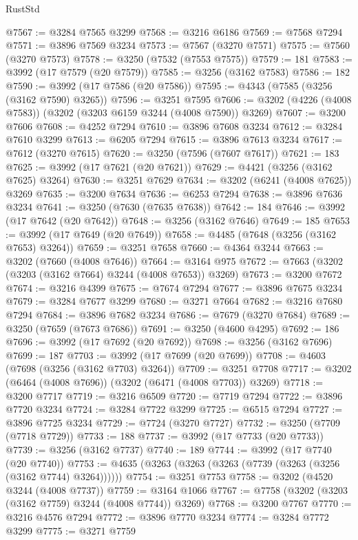 \begin{lexlean}{RustStd}
\begin{coremodule}
@7567 := @3284 @7565 @3299
@7568 := @3216 @6186
@7569 := @7568 @7294
@7571 := @3896 @7569 @3234
@7573 := @7567 (@3270 @7571)
@7575 := @7560 (@3270 @7573)
@7578 := @3250 (@7532 (@7553 @7575))
@7579 := 181
@7583 := @3992 (@17 @7579 (@20 @7579))
@7585 := @3256 (@3162 @7583)
@7586 := 182
@7590 := @3992 (@17 @7586 (@20 @7586))
@7595 := @4343 (@7585 (@3256 (@3162 @7590) @3265))
@7596 := @3251 @7595
@7606 := @3202 (@4226 (@4008 @7583)) (@3202 (@3203 @6159 @3244 (@4008 @7590)) @3269)
@7607 := @3200 @7606
@7608 := @4252 @7294
@7610 := @3896 @7608 @3234
@7612 := @3284 @7610 @3299
@7613 := @6205 @7294
@7615 := @3896 @7613 @3234
@7617 := @7612 (@3270 @7615)
@7620 := @3250 (@7596 (@7607 @7617))
@7621 := 183
@7625 := @3992 (@17 @7621 (@20 @7621))
@7629 := @4421 (@3256 (@3162 @7625) @3264)
@7630 := @3251 @7629
@7634 := @3202 (@6241 (@4008 @7625)) @3269
@7635 := @3200 @7634
@7636 := @6253 @7294
@7638 := @3896 @7636 @3234
@7641 := @3250 (@7630 (@7635 @7638))
@7642 := 184
@7646 := @3992 (@17 @7642 (@20 @7642))
@7648 := @3256 (@3162 @7646)
@7649 := 185
@7653 := @3992 (@17 @7649 (@20 @7649))
@7658 := @4485 (@7648 (@3256 (@3162 @7653) @3264))
@7659 := @3251 @7658
@7660 := @4364 @3244
@7663 := @3202 (@7660 (@4008 @7646))
@7664 := @3164 @975
@7672 := @7663 (@3202 (@3203 (@3162 @7664) @3244 (@4008 @7653)) @3269)
@7673 := @3200 @7672
@7674 := @3216 @4399
@7675 := @7674 @7294
@7677 := @3896 @7675 @3234
@7679 := @3284 @7677 @3299
@7680 := @3271 @7664
@7682 := @3216 @7680 @7294
@7684 := @3896 @7682 @3234
@7686 := @7679 (@3270 @7684)
@7689 := @3250 (@7659 (@7673 @7686))
@7691 := @3250 (@4600 @4295)
@7692 := 186
@7696 := @3992 (@17 @7692 (@20 @7692))
@7698 := @3256 (@3162 @7696)
@7699 := 187
@7703 := @3992 (@17 @7699 (@20 @7699))
@7708 := @4603 (@7698 (@3256 (@3162 @7703) @3264))
@7709 := @3251 @7708
@7717 := @3202 (@6464 (@4008 @7696)) (@3202 (@6471 (@4008 @7703)) @3269)
@7718 := @3200 @7717
@7719 := @3216 @6509
@7720 := @7719 @7294
@7722 := @3896 @7720 @3234
@7724 := @3284 @7722 @3299
@7725 := @6515 @7294
@7727 := @3896 @7725 @3234
@7729 := @7724 (@3270 @7727)
@7732 := @3250 (@7709 (@7718 @7729))
@7733 := 188
@7737 := @3992 (@17 @7733 (@20 @7733))
@7739 := @3256 (@3162 @7737)
@7740 := 189
@7744 := @3992 (@17 @7740 (@20 @7740))
@7753 := @4635 (@3263 (@3263 (@3263 (@7739 (@3263 (@3256 (@3162 @7744) @3264))))))
@7754 := @3251 @7753
@7758 := @3202 (@4520 @3244 (@4008 @7737))
@7759 := @3164 @1066
@7767 := @7758 (@3202 (@3203 (@3162 @7759) @3244 (@4008 @7744)) @3269)
@7768 := @3200 @7767
@7770 := @3216 @4576 @7294
@7772 := @3896 @7770 @3234
@7774 := @3284 @7772 @3299
@7775 := @3271 @7759

\end{coremodule}
\end{lexlean}
